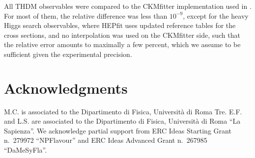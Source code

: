 \documentclass[preprint,3p,12pt]{elsarticle}
\begin{document}
All THDM observables were compared to the CKMfitter implementation used in \cite{Eberhardt:2013uba,Eberhardt:2013wia,Baglio:2014nea,Chowdhury:2015yja}. For most of them, the relative difference was less than $10^{-9}$, except for the heavy Higgs search observables, where HEPfit uses updated reference tables for the cross sections, and no interpolation was used on the CKMfitter side, such that the relative error amounts to maximally a few percent, which we assume to be sufficient given the experimental precision.




\section*{Acknowledgments}
M.C. is associated to the Dipartimento di Fisica, Universit\`a di Roma
Tre. E.F. and L.S. are associated to the Dipartimento di Fisica,
Universit\`a di Roma ``La Sapienza''. We acknowledge partial support
from ERC Ideas Starting Grant n.~279972 ``NPFlavour'' and ERC Ideas
Advanced Grant n.~267985 ``DaMeSyFla''.



















\end{document}
